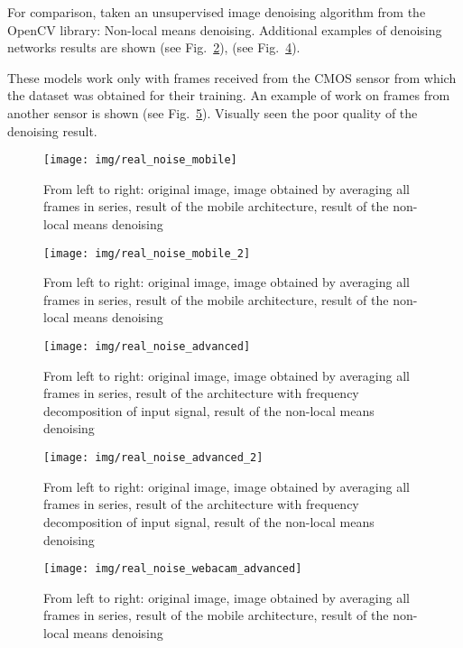 \documentclass[runningheads]{llncs}
\begin{document}
For comparison, taken an unsupervised image denoising algorithm from the OpenCV library: Non-local means denoising. Additional examples of denoising networks results are shown (see Fig.~\ref{fig:real_noise_mobile_2}), (see Fig.~\ref{fig:real_noise_advanced_2}).

These models work only with frames received from the CMOS sensor from which the dataset was obtained for their training. An example of work on frames from another sensor is shown (see Fig.~\ref{fig:real_noise_webacam_advanced}). Visually seen the poor quality of the denoising result.

\begin{figure}
	\centering
	\texttt{[image: img/real\_noise\_mobile]}
	\caption{From left to right: original image, image obtained by averaging all frames in series, result of the mobile architecture, result of the non-local means denoising}
	\label{fig:real_noise_mobile}
\end{figure}

\begin{figure}
	\centering
	\texttt{[image: img/real\_noise\_mobile\_2]}
	\caption{From left to right: original image, image obtained by averaging all frames in series, result of the mobile architecture, result of the non-local means denoising}
	\label{fig:real_noise_mobile_2}
\end{figure}


\begin{figure}
	\centering
	\texttt{[image: img/real\_noise\_advanced]}
	\caption{From left to right: original image, image obtained by averaging all frames in series, result of the architecture with frequency decomposition of input signal, result of the non-local means denoising}
	\label{fig:real_noise_advanced}
\end{figure}

\begin{figure}
	\centering
	\texttt{[image: img/real\_noise\_advanced\_2]}
	\caption{From left to right: original image, image obtained by averaging all frames in series, result of the architecture with frequency decomposition of input signal, result of the non-local means denoising}
	\label{fig:real_noise_advanced_2}
\end{figure}


\begin{figure}
	\centering
	\texttt{[image: img/real\_noise\_webacam\_advanced]}
	\caption{From left to right: original image, image obtained by averaging all frames in series, result of the mobile architecture, result of the non-local means denoising}
	\label{fig:real_noise_webacam_advanced}
\end{figure}
\end{document}
